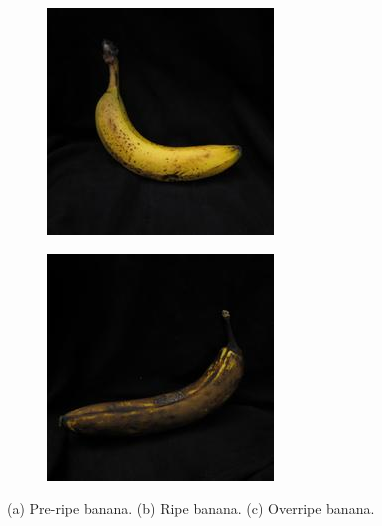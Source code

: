 \documentclass[final]{beamer}
\newlength{\onecolwid}
\begin{document}
\begin{frame}[t]
\begin{columns}[t]
\begin{column}{\onecolwid}
\begin{figure}
\begin{subfigure}{.28\textwidth}
\caption{}
\label{fig;preripe}
\end{subfigure}%
\quad
 \begin{subfigure}{.28\textwidth}
  \centering
\includegraphics[width=\textwidth]{2_ripe.jpg}
\caption{}
\label{fig:ripe}
\end{subfigure}%
\quad
  \begin{subfigure}{.28\textwidth}
  \centering
\includegraphics[width=\textwidth]{0_overripe.jpg}
\caption{}
\label{fig:overripe}
\end{subfigure}%
\caption{  (a) Pre-ripe banana. (b) Ripe banana. (c) Overripe banana.}
\end{figure}
\end{column}


\end{columns}
\end{frame}
\end{document}
